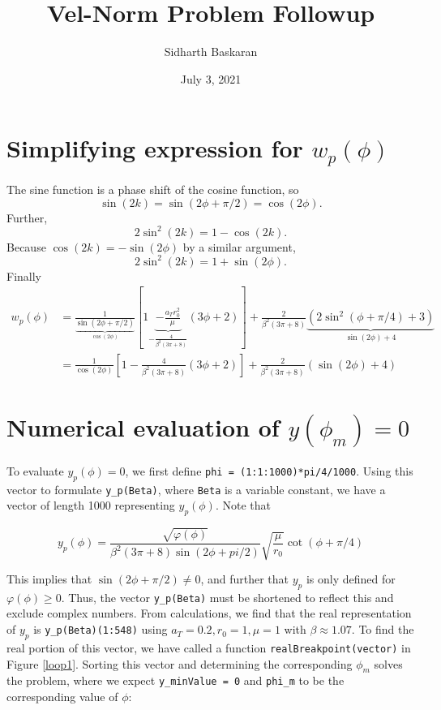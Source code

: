 \documentclass[11pt]{article}
\title{Vel-Norm Problem Followup}
\author{Sidharth Baskaran}
\date{July 3, 2021}
\begin{document}

\maketitle

\section{Simplifying expression for \texorpdfstring{$w_p(\phi)$}{}}

The sine function is a phase shift of the cosine function, so 
\begin{equation}
    \sin(2k)=\sin(2\phi+\pi/2)=\cos(2\phi).
\end{equation}
Further,
\begin{equation}
    2\sin^2(2k)=1-\cos(2k).
\end{equation}
Because $\cos(2k)=-\sin(2\phi)$ by a similar argument, 
\begin{equation}
    2\sin^2(2k)=1+\sin(2\phi).
\end{equation}
Finally
\begin{align}
    w_p(\phi)&=\frac{1}{\underbrace{\sin(2\phi+\pi/2)}_{\cos(2\phi)}}[1\underbrace{-\frac{a_Tr_0^2}{\mu}}_{-\frac{4}{\beta^2(3\pi+8)}}(3\phi+2)]+\frac{2}{\beta^2(3\pi+8)}\underbrace{(2\sin^2(\phi+\pi/4)+3)}_{\sin(2\phi)+4}\\
    &=\frac{1}{\cos(2\phi)}\left[1-\frac{4}{\beta^2(3\pi+8)}(3\phi+2)\right]+\frac{2}{\beta^2(3\pi+8)}(\sin(2\phi)+4)
\end{align}

\section{Numerical evaluation of \texorpdfstring{$y(\phi_m)=0$}{}}

To evaluate $y_p(\phi)=0$, we first define \verb|phi = (1:1:1000)*pi/4/1000|. 
Using this vector to formulate \verb|y_p(Beta)|, where \verb|Beta| is a variable constant, we have a vector of length 1000 representing $y_p(\phi)$.
Note that

\begin{equation}
    y_p(\phi)=\frac{\sqrt{\varphi(\phi)}}{\beta^2(3\pi+8)\sin(2\phi+pi/2)}\sqrt{\frac{\mu}{r_0}}\cot(\phi+\pi/4)
\end{equation}

This implies that $\sin(2\phi+\pi/2)\neq 0$, and further that $y_p$ is only defined for $\varphi(\phi)\geq 0$. Thus, the vector \verb|y_p(Beta)| must be shortened to reflect this and exclude complex numbers.
From calculations, we find that the real representation of $y_p$ is \verb|y_p(Beta)(1:548)| using $a_T=0.2,r_0=1,\mu=1$ with $\beta\approx 1.07$.
To find the real portion of this vector, we have called a function \verb|realBreakpoint(vector)| in Figure \ref{loop1}.
Sorting this vector and determining the corresponding $\phi_m$ solves the problem, where we expect \verb|y_minValue = 0| and \verb|phi_m| to be the corresponding value of $\phi$:
\end{document}
